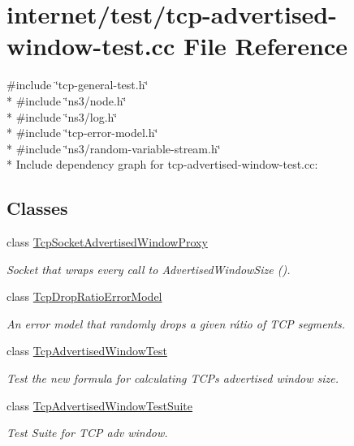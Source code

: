 \hypertarget{tcp-advertised-window-test_8cc}{}\section{internet/test/tcp-\/advertised-\/window-\/test.cc File Reference}
\label{tcp-advertised-window-test_8cc}
{\ttfamily \#include \char`\"{}tcp-\/general-\/test.\+h\char`\"{}}\\*
{\ttfamily \#include \char`\"{}ns3/node.\+h\char`\"{}}\\*
{\ttfamily \#include \char`\"{}ns3/log.\+h\char`\"{}}\\*
{\ttfamily \#include \char`\"{}tcp-\/error-\/model.\+h\char`\"{}}\\*
{\ttfamily \#include \char`\"{}ns3/random-\/variable-\/stream.\+h\char`\"{}}\\*
Include dependency graph for tcp-\/advertised-\/window-\/test.cc\+:
\subsection*{Classes}
\begin{DoxyCompactItemize}
\item 
class \hyperlink{classTcpSocketAdvertisedWindowProxy}{Tcp\+Socket\+Advertised\+Window\+Proxy}
\begin{DoxyCompactList}\small\item\em Socket that wraps every call to Advertised\+Window\+Size (). \end{DoxyCompactList}\item 
class \hyperlink{classTcpDropRatioErrorModel}{Tcp\+Drop\+Ratio\+Error\+Model}
\begin{DoxyCompactList}\small\item\em An error model that randomly drops a given rátio of T\+CP segments. \end{DoxyCompactList}\item 
class \hyperlink{classTcpAdvertisedWindowTest}{Tcp\+Advertised\+Window\+Test}
\begin{DoxyCompactList}\small\item\em Test the new formula for calculating T\+CP\textquotesingle{}s advertised window size. \end{DoxyCompactList}\item 
class \hyperlink{classTcpAdvertisedWindowTestSuite}{Tcp\+Advertised\+Window\+Test\+Suite}
\begin{DoxyCompactList}\small\item\em Test Suite for T\+CP adv window. \end{DoxyCompactList}\end{DoxyCompactItemize}
